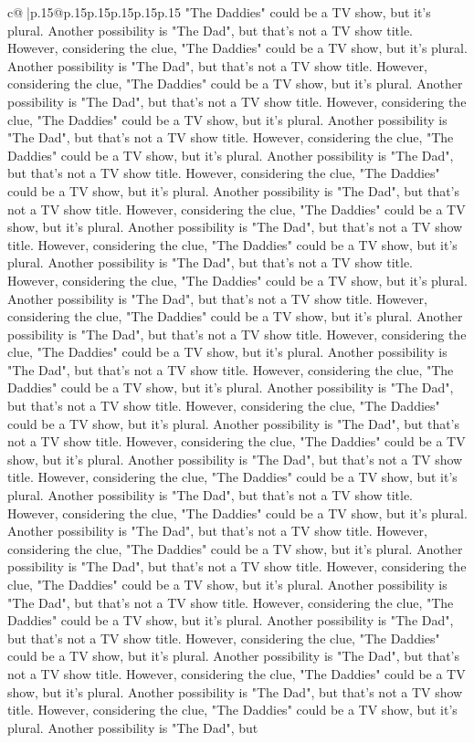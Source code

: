 \documentclass{article}
\begin{document}
{\begin{supertabular}{c@{$\;$}|p{.15\linewidth}@{}p{.15\linewidth}p{.15\linewidth}p{.15\linewidth}p{.15\linewidth}p{.15\linewidth}}
{{{"The Daddies" could be a TV show, but it's plural. Another possibility is "The Dad", but that's not a TV show title. However, considering the clue, "The Daddies" could be a TV show, but it's plural. Another possibility is "The Dad", but that's not a TV show title. However, considering the clue, "The Daddies" could be a TV show, but it's plural. Another possibility is "The Dad", but that's not a TV show title. However, considering the clue, "The Daddies" could be a TV show, but it's plural. Another possibility is "The Dad", but that's not a TV show title. However, considering the clue, "The Daddies" could be a TV show, but it's plural. Another possibility is "The Dad", but that's not a TV show title. However, considering the clue, "The Daddies" could be a TV show, but it's plural. Another possibility is "The Dad", but that's not a TV show title. However, considering the clue, "The Daddies" could be a TV show, but it's plural. Another possibility is "The Dad", but that's not a TV show title. However, considering the clue, "The Daddies" could be a TV show, but it's plural. Another possibility is "The Dad", but that's not a TV show title. However, considering the clue, "The Daddies" could be a TV show, but it's plural. Another possibility is "The Dad", but that's not a TV show title. However, considering the clue, "The Daddies" could be a TV show, but it's plural. Another possibility is "The Dad", but that's not a TV show title. However, considering the clue, "The Daddies" could be a TV show, but it's plural. Another possibility is "The Dad", but that's not a TV show title. However, considering the clue, "The Daddies" could be a TV show, but it's plural. Another possibility is "The Dad", but that's not a TV show title. However, considering the clue, "The Daddies" could be a TV show, but it's plural. Another possibility is "The Dad", but that's not a TV show title. However, considering the clue, "The Daddies" could be a TV show, but it's plural. Another possibility is "The Dad", but that's not a TV show title. However, considering the clue, "The Daddies" could be a TV show, but it's plural. Another possibility is "The Dad", but that's not a TV show title. However, considering the clue, "The Daddies" could be a TV show, but it's plural. Another possibility is "The Dad", but that's not a TV show title. However, considering the clue, "The Daddies" could be a TV show, but it's plural. Another possibility is "The Dad", but that's not a TV show title. However, considering the clue, "The Daddies" could be a TV show, but it's plural. Another possibility is "The Dad", but that's not a TV show title. However, considering the clue, "The Daddies" could be a TV show, but it's plural. Another possibility is "The Dad", but that's not a TV show title. However, considering the clue, "The Daddies" could be a TV show, but it's plural. Another possibility is "The Dad", but that's not a TV show title. However, considering the clue, "The Daddies" could be a TV show, but it's plural. Another possibility is "The Dad", but that's not a TV show title. However, considering the clue, "The Daddies" could be a TV show, but it's plural. Another possibility is "The Dad", but }}}
\end{supertabular}}
\end{document}
